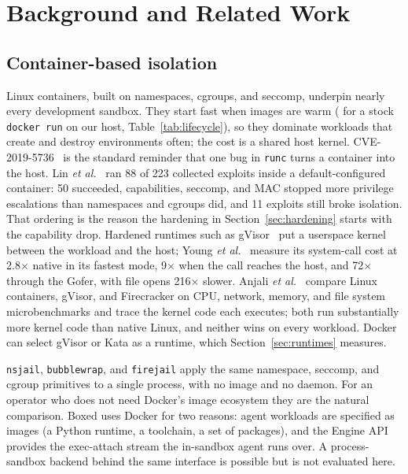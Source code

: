 \documentclass[conference]{IEEEtran}
\begin{document}
\section{Background and Related Work}\label{sec:related}

\subsection{Container-based isolation}
Linux containers, built on namespaces, cgroups, and seccomp, underpin nearly
every development sandbox. They start fast when images are warm
(\BaseDefCreateMedian{} for a stock \texttt{docker run} on our host,
Table~\ref{tab:lifecycle}), so they dominate workloads that create and
destroy environments often; the cost is a shared host kernel.
CVE-2019-5736~\cite{runc-cve} is the standard reminder that one bug in
\texttt{runc} turns a container into the host. Lin \emph{et
al.}~\cite{container-measure} ran 88 of 223 collected exploits inside a
default-configured container: 50 succeeded, capabilities, seccomp, and MAC
stopped more privilege escalations than namespaces and cgroups did, and 11
exploits still broke isolation. That ordering is the reason the hardening
in Section~\ref{sec:hardening} starts with the capability drop. Hardened
runtimes such as gVisor~\cite{gvisor} put a userspace kernel between the
workload and the host; Young \emph{et al.}~\cite{gvisor-cost} measure its
system-call cost at 2.8$\times$ native in its fastest mode, 9$\times$ when
the call reaches the host, and 72$\times$ through the Gofer, with file opens
216$\times$ slower. Anjali \emph{et al.}~\cite{anjali-blending} compare
Linux containers, gVisor, and Firecracker on CPU, network, memory, and file
system microbenchmarks and trace the kernel code each executes; both run
substantially more kernel code than native Linux, and neither wins on every
workload. Docker can select gVisor or Kata as a runtime, which
Section~\ref{sec:runtimes} measures.

\texttt{nsjail}, \texttt{bubblewrap}, and \texttt{firejail} apply the same
namespace, seccomp, and cgroup primitives to a single process, with no image
and no daemon. For an operator who does not need Docker's image ecosystem
they are the natural comparison. Boxed uses Docker for two reasons: agent
workloads are specified as images (a Python runtime, a toolchain, a set of
packages), and the Engine API provides the exec-attach stream the in-sandbox
agent runs over. A process-sandbox backend behind the same interface is
possible but is not evaluated here.
\end{document}
